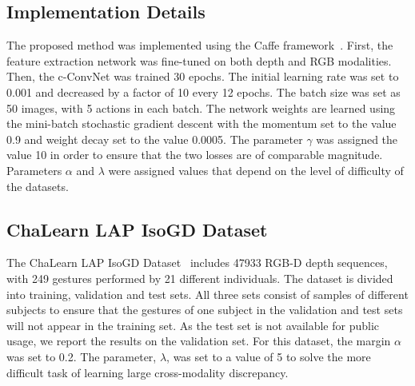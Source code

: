 \documentclass[letterpaper]{article} %
\begin{document}
\subsection{Implementation Details}
The proposed method was implemented using the Caffe
framework~\cite{jia2014caffe}. First, the feature extraction network was
fine-tuned on both depth and RGB modalities. Then, the c-ConvNet was trained 30
epochs. The initial learning rate was set to 0.001 and decreased by a factor of
10 every 12 epochs. The batch size was set as 50 images, with 5 actions in each
batch. The network weights are learned using the mini-batch stochastic gradient
descent with the momentum set to the value 0.9 and weight decay set to the value
0.0005. The parameter $\gamma$ was assigned the value 10 in order to ensure
that the two losses are of comparable magnitude. Parameters $\alpha$ and
$\lambda$ were assigned values that depend on the level of difficulty of the
datasets.

\subsection{ChaLearn LAP IsoGD Dataset} The ChaLearn LAP IsoGD
Dataset~\cite{wanchalearn} includes
47933 RGB-D depth sequences, with 249 gestures performed by 21 different individuals. The dataset is divided into training, validation and test sets. All three sets consist of
samples of different subjects to ensure that the gestures of one subject in the
validation and test sets will not appear in the training set. As the test set is
not available for public usage, we report the results on the validation set. For
this dataset, the margin $\alpha$ was set to 0.2. The parameter, $\lambda$, was
set to a value of 5 to solve the more difficult task of learning large
cross-modality discrepancy.
\end{document}
